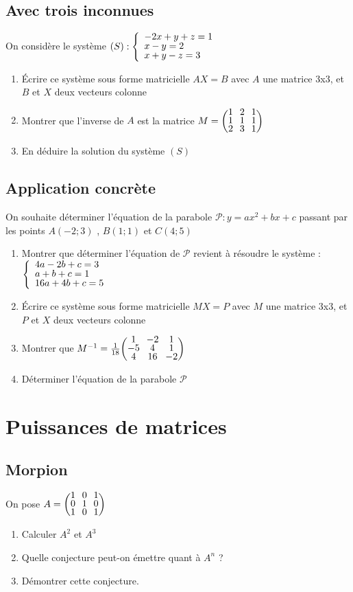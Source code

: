 \documentclass[oneside,12pt]{book}          %
\begin{document}
\subsection{Avec trois inconnues}
On considère le système $(S):\accol{-2x+y+z=1\\x-y=2\\x+y-z=3}$
    \begin{enumerate}
        \item Écrire ce système sous forme matricielle $AX=B$ avec $A$ une matrice 3x3, et $B$ et $X$ deux vecteurs colonne
        \item Montrer que l'inverse de $A$ est la matrice $M=\matrice{1&2&1\\1&1&1\\2&3&1}$
        \item En déduire la solution du système $(S)$
    \end{enumerate}


\subsection{Application concrète}
On souhaite déterminer l'équation de la parabole $\mathscr{P}:y=ax^2+bx+c$ passant par les points $A(-2;3)$ , $B(1;1)$ et $C(4;5)$
    \begin{enumerate}
        \item Montrer que déterminer l'équation de $\mathscr{P}$ revient à résoudre le système : $\accol{4a-2b+c=3\\a+b+c=1\\16a+4b+c=5}$
        \item Écrire ce système sous forme matricielle $MX=P$ avec $M$ une matrice 3x3, et $P$ et $X$ deux vecteurs colonne
        \item Montrer que $M^{-1}=\frac{1}{18}\matrice{1&-2&1\\-5&4&1\\4&16&-2} $
        \item Déterminer l'équation de la parabole $\mathscr{P}$
    \end{enumerate}




\section{Puissances de matrices}

\subsection{Morpion}
On pose $A=\matrice{1&0&1\\0&1&0\\1&0&1} $
    \begin{enumerate}
        \item Calculer $A^2$ et $A^3$
        \item Quelle conjecture peut-on émettre quant à $A^n$ ?
        \item Démontrer cette conjecture.
    \end{enumerate}
\end{document}
